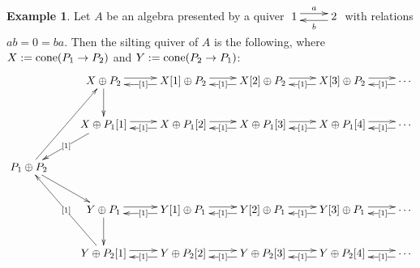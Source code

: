 \documentclass[a4paper,reqno]{amsart}
\theoremstyle{definition}
\newtheorem{example}[theorem]{Example}
\begin{document}
\begin{example}
Let $A$ be an algebra presented by a quiver $\xymatrix{1\ar^a@<.3em>[r]&\ar^b@<.3em>[l]2}$
with relations $ab=0=ba$.
Then the silting quiver of $A$ is the following, where $X:={\rm cone}(P_1\to P_2)$ and $Y:={\rm cone}(P_2\to P_1)$:
\[
\xymatrix{
&X\oplus P_2\ar@<.3em>[r]\ar[d]&X[1]\oplus P_2\ar@<.3em>[r]\ar@<.3em>[l]|{[1]}
&X[2]\oplus P_2\ar@<.3em>[r]\ar@<.3em>[l]|{[1]}&X[3]\oplus P_2\ar@<.3em>[r]\ar@<.3em>[l]|{[1]}&\cdots\ar@<.3em>[l]|(0.35){[1]}\\
&X\oplus P_1[1]\ar@<.3em>[r]\ar[ld]|{[1]}&X\oplus P_1[2]\ar@<.3em>[r]\ar@<.3em>[l]|{[1]}
&X\oplus P_1[3]\ar@<.3em>[r]\ar@<.3em>[l]|{[1]}&X\oplus P_1[4]\ar@<.3em>[r]\ar@<.3em>[l]|{[1]}&\cdots\ar@<.3em>[l]|(0.35){[1]}\\
P_1\oplus P_2\ar[ruu]\ar[rd]\\
&Y\oplus P_1\ar@<.3em>[r]\ar[d]&Y[1]\oplus P_1\ar@<.3em>[r]\ar@<.3em>[l]|{[1]}
&Y[2]\oplus P_1\ar@<.3em>[r]\ar@<.3em>[l]|{[1]}&Y[3]\oplus P_1\ar@<.3em>[r]\ar@<.3em>[l]|{[1]}&\cdots\ar@<.3em>[l]|(0.35){[1]}\\
&Y\oplus P_2[1]\ar@<.3em>[r]\ar[luu]|{[1]}&Y\oplus P_2[2]\ar@<.3em>[r]\ar@<.3em>[l]|{[1]}
&Y\oplus P_2[3]\ar@<.3em>[r]\ar@<.3em>[l]|{[1]}&Y\oplus P_2[4]\ar@<.3em>[r]\ar@<.3em>[l]|{[1]}&\cdots\ar@<.3em>[l]|(0.35){[1]}
}\]
\end{example}
\end{document}
